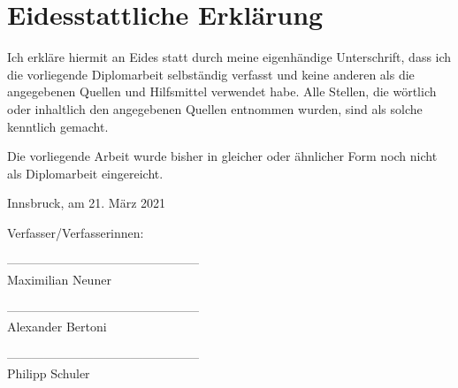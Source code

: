 \section*{Eidesstattliche Erklärung}

Ich erkläre hiermit an Eides statt durch meine eigenhändige Unterschrift, dass ich die vorliegende Diplomarbeit selbständig verfasst und keine anderen als die angegebenen Quellen und Hilfsmittel verwendet habe. Alle Stellen, die wörtlich oder inhaltlich den angegebenen Quellen entnommen wurden, sind als solche kenntlich gemacht.

Die vorliegende Arbeit wurde bisher in gleicher oder ähnlicher Form noch nicht als Diplomarbeit eingereicht.

Innsbruck, am 21. März 2021

\vspace*{3cm}



Verfasser/Verfasserinnen:

\vspace*{2cm}


-----------------------------------------------\\
\hspace*{1.3cm}           Maximilian Neuner

\vspace*{2cm}


-----------------------------------------------\\
\hspace*{1.3cm}           Alexander Bertoni

\vspace*{2cm}


-----------------------------------------------\\
\hspace*{1.3cm}           Philipp Schuler



\newpage
